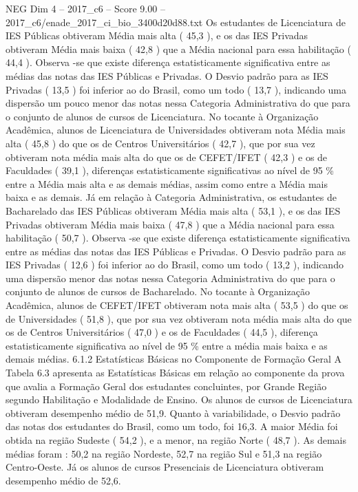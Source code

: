 \begin{textsample}{NEG Dim 4 – 2017\_c6 – Score 9.00 – 2017\_c6/enade\_2017\_ci\_bio\_3400d20d88.txt}
Os estudantes de Licenciatura de IES Públicas obtiveram Média mais alta ( 45,3 ), e os das IES Privadas obtiveram Média mais baixa ( 42,8 ) que a Média nacional para essa habilitação ( 44,4 ).
Observa -se que existe diferença estatisticamente significativa entre as médias das notas das IES Públicas e Privadas.
O Desvio padrão para as IES Privadas ( 13,5 ) foi inferior ao do Brasil, como um todo ( 13,7 ), indicando uma dispersão um pouco menor das notas nessa Categoria Administrativa do que para o conjunto de alunos de cursos de Licenciatura.
No tocante à Organização Acadêmica, alunos de Licenciatura de Universidades obtiveram nota Média mais alta ( 45,8 ) do que os de Centros Universitários ( 42,7 ), que por sua vez obtiveram nota média mais alta do que os de CEFET/IFET ( 42,3 ) e os de Faculdades ( 39,1 ), diferenças estatisticamente significativas ao nível de 95 \% entre a Média mais alta e as demais médias, assim como entre a Média mais baixa e as demais.
Já em relação à Categoria Administrativa, os estudantes de Bacharelado das IES Públicas obtiveram Média mais alta ( 53,1 ), e os das IES Privadas obtiveram Média mais baixa ( 47,8 ) que a Média nacional para essa habilitação ( 50,7 ).
Observa -se que existe diferença estatisticamente significativa entre as médias das notas das IES Públicas e Privadas.
O Desvio padrão para as IES Privadas ( 12,6 ) foi inferior ao do Brasil, como um todo ( 13,2 ), indicando uma dispersão menor das notas nessa Categoria Administrativa do que para o conjunto de alunos de cursos de Bacharelado.
No tocante à Organização Acadêmica, alunos de CEFET/IFET obtiveram nota mais alta ( 53,5 ) do que os de Universidades ( 51,8 ), que por sua vez obtiveram nota média mais alta do que os de Centros Universitários ( 47,0 ) e os de Faculdades ( 44,5 ), diferença estatisticamente significativa ao nível de 95 \% entre a média mais baixa e as demais médias. 6.1.2 Estatísticas Básicas no Componente de Formação Geral A Tabela 6.3 apresenta as Estatísticas Básicas em relação ao componente da prova que avalia a Formação Geral dos estudantes concluintes, por Grande Região segundo Habilitação e Modalidade de Ensino.
Os alunos de cursos de Licenciatura obtiveram desempenho médio de 51,9.
Quanto à variabilidade, o Desvio padrão das notas dos estudantes do Brasil, como um todo, foi 16,3.
A maior Média foi obtida na região Sudeste ( 54,2 ), e a menor, na região Norte ( 48,7 ).
As demais médias foram : 50,2 na região Nordeste, 52,7 na região Sul e 51,3 na região Centro-Oeste.
Já os alunos de cursos Presenciais de Licenciatura obtiveram desempenho médio de 52,6.

\end{textsample}

